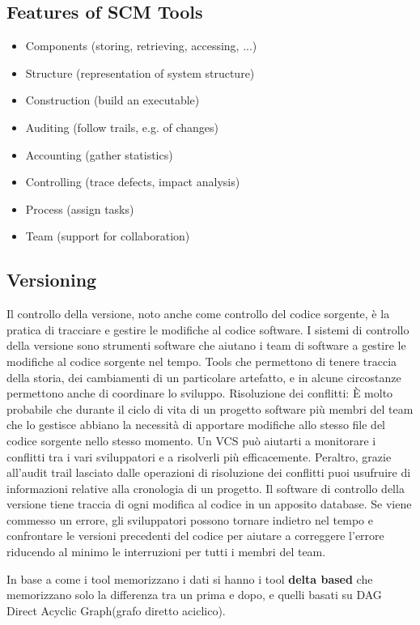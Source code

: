 \documentclass[10pt,a4paper]{book}
\begin{document}
\subsection{Features of SCM Tools}
\begin{itemize}
\item Components (storing, retrieving, accessing, ...)
\item Structure (representation of system structure)
\item Construction (build an executable)
\item Auditing (follow trails, e.g. of changes)
\item Accounting (gather statistics)
\item Controlling (trace defects, impact analysis)
\item Process (assign tasks)
\item Team (support for collaboration)
\end{itemize}

\subsection{Versioning}
Il controllo della versione, noto anche come controllo del codice sorgente, è la pratica di tracciare e gestire le modifiche al codice software. I sistemi di controllo della versione sono strumenti software che aiutano i team di software a gestire le modifiche al codice sorgente nel tempo.
Tools che permettono di tenere traccia della storia, dei cambiamenti di un particolare artefatto, e in alcune circostanze permettono anche di coordinare lo sviluppo.
Risoluzione dei conflitti: È molto probabile che durante il ciclo di vita di un progetto software più membri del team che lo gestisce abbiano la necessità di apportare modifiche allo stesso file del codice sorgente nello stesso momento. Un VCS può aiutarti a monitorare i conflitti tra i vari sviluppatori e a risolverli più efficacemente. Peraltro, grazie all'audit trail lasciato dalle operazioni di risoluzione dei conflitti puoi usufruire di informazioni relative alla cronologia di un progetto.
Il software di controllo della versione tiene traccia di ogni modifica al codice in un apposito database. Se viene commesso un errore, gli sviluppatori possono tornare indietro nel tempo e confrontare le versioni precedenti del codice per aiutare a correggere l'errore riducendo al minimo le interruzioni per tutti i membri del team.

In base a come i tool memorizzano i dati si hanno i tool \textbf{delta based} che memorizzano solo la differenza tra un prima e dopo, e quelli basati su DAG Direct Acyclic Graph(grafo diretto aciclico).
\end{document}
